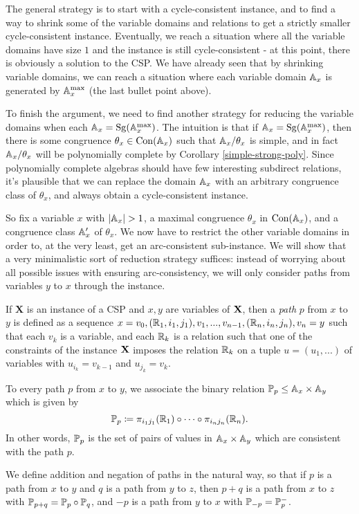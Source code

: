 \documentclass[letterpaper,11pt]{article}
\DeclareMathOperator{\Sg}{Sg}
\DeclareMathOperator{\Con}{Con}
\begin{document}
The general strategy is to start with a cycle-consistent instance, and to find a way to shrink some of the variable domains and relations to get a strictly smaller cycle-consistent instance. Eventually, we reach a situation where all the variable domains have size $1$ and the instance is still cycle-consistent - at this point, there is obviously a solution to the CSP. We have already seen that by shrinking variable domains, we can reach a situation where each variable domain $\mathbb{A}_x$ is generated by $\mathbb{A}_x^{\max}$ (the last bullet point above).

To finish the argument, we need to find another strategy for reducing the variable domains when each $\bA_x = \Sg(\bA_x^{\max})$. The intuition is that if $\bA_x = \Sg(\bA_x^{\max})$, then there is some congruence $\theta_x \in \Con(\bA_x)$ such that $\mathbb{A}_x/\theta_x$ is simple, and in fact $\mathbb{A}_x/\theta_x$ will be polynomially complete by Corollary \ref{simple-strong-poly}. Since polynomially complete algebras should have few interesting subdirect relations, it's plausible that we can replace the domain $\mathbb{A}_x$ with an arbitrary congruence class of $\theta_x$, and always obtain a cycle-consistent instance.

So fix a variable $x$ with $|\mathbb{A}_x| > 1$, a maximal congruence $\theta_x$ in $\Con(\bA_x)$, and a congruence class $\mathbb{A}_x'$ of $\theta_x$. We now have to restrict the other variable domains in order to, at the very least, get an arc-consistent sub-instance. We will show that a very minimalistic sort of reduction strategy suffices: instead of worrying about all possible issues with ensuring arc-consistency, we will only consider paths from variables $y$ to $x$ through the instance.

\begin{defn}\label{path-defn} If $\mathbf{X}$ is an instance of a CSP and $x,y$ are variables of $\mathbf{X}$, then a \emph{path} $p$ from $x$ to $y$ is defined as a sequence $x = v_0, (\mathbb{R}_1,i_1,j_1), v_1, ..., v_{n-1}, (\mathbb{R}_n,i_n,j_n), v_n = y$ such that each $v_k$ is a variable, and each $\mathbb{R}_k$ is a relation such that one of the constraints of the instance $\mathbf{X}$ imposes the relation $\mathbb{R}_k$ on a tuple $u = (u_1, ...)$ of variables with $u_{i_k} = v_{k-1}$ and $u_{j_k} = v_k$.

To every path $p$ from $x$ to $y$, we associate the binary relation $\mathbb{P}_p \le \mathbb{A}_x \times \mathbb{A}_y$ which is given by
\[
\mathbb{P}_p \coloneqq \pi_{i_1j_1}(\mathbb{R}_1) \circ \cdots \circ \pi_{i_nj_n}(\mathbb{R}_n).
\]
In other words, $\mathbb{P}_p$ is the set of pairs of values in $\mathbb{A}_x \times \mathbb{A}_y$ which are consistent with the path $p$.

We define addition and negation of paths in the natural way, so that if $p$ is a path from $x$ to $y$ and $q$ is a path from $y$ to $z$, then $p+q$ is a path from $x$ to $z$ with $\mathbb{P}_{p+q} = \mathbb{P}_p \circ \mathbb{P}_q$, and $-p$ is a path from $y$ to $x$ with $\mathbb{P}_{-p} = \mathbb{P}_p^-$.
\end{defn}
\end{document}
